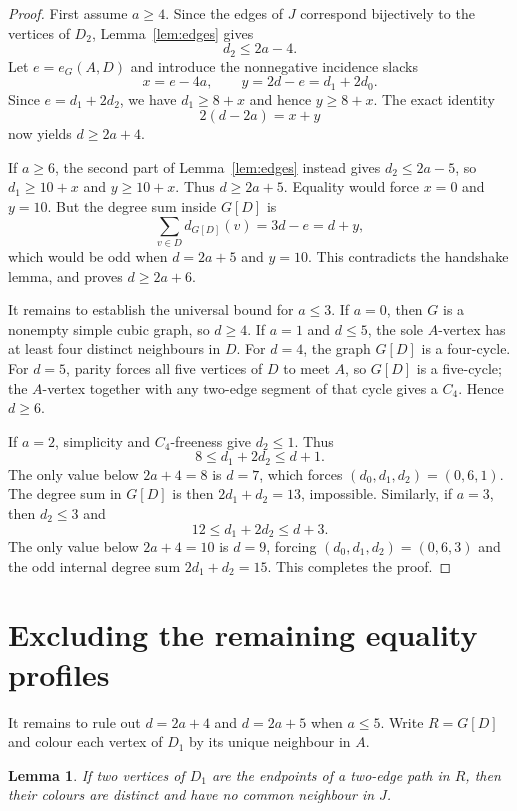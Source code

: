 \documentclass[11pt]{article}
\newtheorem{lemma}[theorem]{Lemma}
\begin{document}
\begin{proof}
First assume $a\ge4$.  Since the edges of $J$ correspond bijectively to the
vertices of $D_2$, Lemma~\ref{lem:edges} gives
\[
 d_2\le2a-4.
\]
Let $e=e_G(A,D)$ and introduce the nonnegative incidence slacks
\[
 x=e-4a,
 \qquad
 y=2d-e=d_1+2d_0.
\]
Since $e=d_1+2d_2$, we have $d_1\ge8+x$ and hence $y\ge8+x$.  The exact
identity
\[
 2(d-2a)=x+y
\]
now yields $d\ge2a+4$.

If $a\ge6$, the second part of Lemma~\ref{lem:edges} instead gives
$d_2\le2a-5$, so $d_1\ge10+x$ and $y\ge10+x$.  Thus $d\ge2a+5$.  Equality
would force $x=0$ and $y=10$.  But the degree sum inside $G[D]$ is
\[
 \sum_{v\in D}d_{G[D]}(v)=3d-e=d+y,
\]
which would be odd when $d=2a+5$ and $y=10$.  This contradicts the
handshake lemma, and proves $d\ge2a+6$.

It remains to establish the universal bound for $a\le3$.
If $a=0$, then $G$ is a nonempty simple cubic graph, so $d\ge4$.  If $a=1$
and $d\le5$, the sole $A$-vertex has at least four distinct neighbours in
$D$.  For $d=4$, the graph $G[D]$ is a four-cycle.  For $d=5$, parity forces
all five vertices of $D$ to meet $A$, so $G[D]$ is a five-cycle; the
$A$-vertex together with any two-edge segment of that cycle gives a
$C_4$.  Hence $d\ge6$.

If $a=2$, simplicity and $C_4$-freeness give $d_2\le1$.  Thus
\[
 8\le d_1+2d_2\le d+1.
\]
The only value below $2a+4=8$ is $d=7$, which forces
$(d_0,d_1,d_2)=(0,6,1)$.  The degree sum in $G[D]$ is then
$2d_1+d_2=13$, impossible.  Similarly, if $a=3$, then $d_2\le3$ and
\[
 12\le d_1+2d_2\le d+3.
\]
The only value below $2a+4=10$ is $d=9$, forcing
$(d_0,d_1,d_2)=(0,6,3)$ and the odd internal degree sum
$2d_1+d_2=15$.  This completes the proof.

\end{proof}

\section{Excluding the remaining equality profiles}

It remains to rule out $d=2a+4$ and $d=2a+5$ when $a\le5$.  Write
$R=G[D]$ and colour each vertex of $D_1$ by its unique neighbour in $A$.

\begin{lemma}\label{lem:twostep}
If two vertices of $D_1$ are the endpoints of a two-edge path in $R$, then
their colours are distinct and have no common neighbour in $J$.
\end{lemma}
\end{document}
